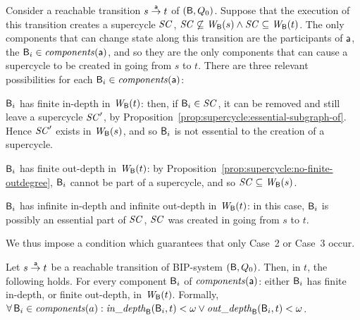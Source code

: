 Consider a reachable transition
$s \la{\act} t$ of $(\B, Q_0)$. Suppose that the execution of 
this transition creates a supercycle $\SC$, \ie $\SC \not\sub \wfg{\B}{s} \land \SC \sub
\wfg{\B}{t}$. The only components that can change state along this
transition are the participants of $\act$, \ie the $\B_i \in \cmps{\act}$, and so
they are the only components that can cause a supercycle to be created
in going from $s$ to $t$.
There are three relevant possibilities for each $\B_i \in \cmps{\act}$:
\bdn

\item[Case 1] \label{case:finite-in}
$\B_i$ has finite in-depth in $\wfg{\B}{t}$: then, if $\B_i \in
\SC$, it can be removed and still leave a supercycle $\SC'$, by
Proposition~\ref{prop:supercycle:essential-subgraph-of}. Hence 
$\SC'$ exists in $\wfg{\B}{s}$, and so 
$\B_i$ is not essential to the creation of a supercycle.

\item[Case 2] \label{case:finite-out}
$\B_i$ has finite out-depth in $\wfg{\B}{t}$: 
by Proposition~\ref{prop:supercycle:no-finite-outdegree}, 
$\B_i$ cannot be part of a supercycle, and so $\SC \sub \wfg{\B}{s}$.

\item[Case 3] \label{case:infinite-both}
$\B_i$ has infinite in-depth and infinite out-depth in
$\wfg{\B}{t}$: in this case, $\B_i$ is possibly an essential part of
$\SC$, \ie $\SC$ was created in going from $s$ to $t$.

\edn
We thus impose a condition which guarantees that only 
Case~2 %
or Case~3 %
occur. 



\bd[$\GLin(\act)$] \label{def:global:dfc}
Let $s \goesto[\act] t$ be a reachable transition of BIP-system $(\B, Q_0)$.
Then, in $t$, the following holds. 
For every component $\B_i$ of $\cmps{\act}$:  either $\B_i$ has finite in-depth,
or finite out-depth, in $\wfg{\B}{t}$.
Formally,\\
\ind  $\fa \B_i \in \cmps{a}: \widepth{\B}{\B_i}{t} < \omega \lor \wodepth{\B}{\B_i}{t} < \omega$.
\ed



